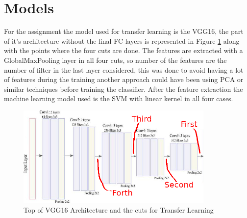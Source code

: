 \documentclass[12pt,a4paper]{article}
\begin{document}
\section*{Models}
For the assignment the model used for transfer learning is the VGG16, the part of it's architecture without the final FC layers is represented in Figure \ref{fig:VGG16} along with the points where the four cuts are done. The features are extracted with a GlobalMaxPooling layer in all four cuts, so number of the features are the number of filter in the last layer considered, this was done to avoid having a lot of features during the training another approach could have been using PCA or similar techniques before training the classifier.
After the feature extraction the machine learning model used is the SVM with linear kernel in all four cases.
\begin{figure}[!h]
  \centering
  \includegraphics[width=\linewidth, height=5cm]{imgs/VGG16.png}
  \caption{Top of VGG16 Architecture and the cuts for Transfer Learning}
  \label{fig:VGG16}
\end{figure}
\end{document}

